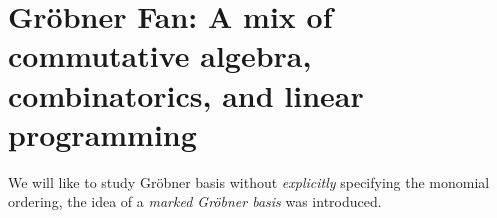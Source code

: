 \section{Gr\"obner Fan: A mix of commutative algebra,
  combinatorics, and linear programming}

We will like to study Gr\"obner basis without \emph{explicitly}
specifying the monomial ordering, the idea of a
\emph{marked Gr\"obner basis} was introduced.

